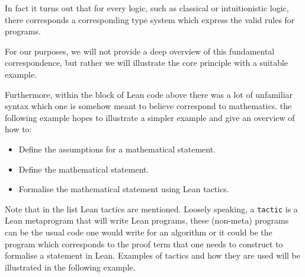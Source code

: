 In fact it turns out that for every logic, such as classical or intuitionistic logic, there corresponds a corresponding type system which express the valid rules for programs. 

For our purposes, we will not provide a deep overview of this fundamental correspondence, but rather we will illustrate the core principle with a suitable example.

Furthermore, within the block of Lean code above there was a lot of unfamiliar syntax which one is somehow meant to believe correspond to mathematics. the following example hopes to
illustrate a simpler example and give an overview of how to:

\begin{itemize}
    \item Define the assumptions for a mathematical statement.
    \item Define the mathematical statement.
    \item Formalise the mathematical statement using Lean tactics.
\end{itemize}

Note that in the list Lean tactics are mentioned. Loosely speaking, a \texttt{tactic} is a Lean metaprogram that will write Lean programs, these (non-meta) programs can
be the usual code one would write for an algorithm or it could be the program which corresponds to the proof term that one needs to construct to formalise
a statement in Lean. Examples of tactics and how they are used will be illustrated in the following example.

